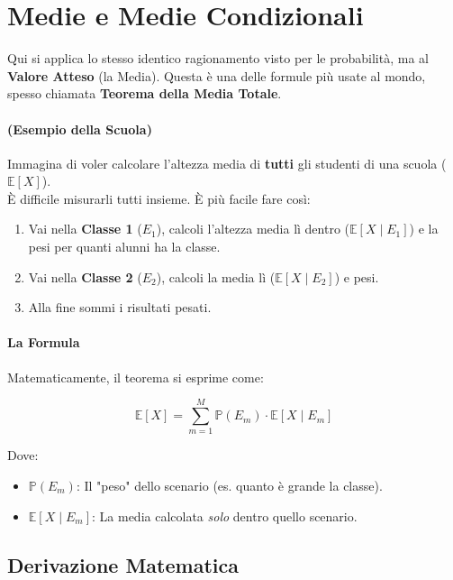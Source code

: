 \section{Medie e Medie Condizionali}

Qui si applica lo stesso identico ragionamento visto per le probabilità, ma al \textbf{Valore Atteso} (la Media). Questa è una delle formule più usate al mondo, spesso chiamata \textbf{Teorema della Media Totale}.

\paragraph{(Esempio della Scuola)}
Immagina di voler calcolare l'altezza media di \textbf{tutti} gli studenti di una scuola ($\mathbb{E}[X]$).
\\È difficile misurarli tutti insieme. È più facile fare così:

\begin{enumerate}
    \item Vai nella \textbf{Classe 1} ($E_1$), calcoli l'altezza media lì dentro ($\mathbb{E}[X \mid E_1]$) e la pesi per quanti alunni ha la classe.
    \item Vai nella \textbf{Classe 2} ($E_2$), calcoli la media lì ($\mathbb{E}[X \mid E_2]$) e pesi.
    \item Alla fine sommi i risultati pesati.
\end{enumerate}

\paragraph{La Formula}
Matematicamente, il teorema si esprime come:

\begin{equation}
\boxed{\mathbb{E}[X] = \sum_{m=1}^M \mathbb{P}(E_m) \cdot \mathbb{E}[X \mid E_m]}
\end{equation}

Dove:
\begin{itemize}
    \item $\mathbb{P}(E_m)$: Il "peso" dello scenario (es. quanto è grande la classe).
    \item $\mathbb{E}[X \mid E_m]$: La media calcolata \textit{solo} dentro quello scenario.
\end{itemize}

\subsection{Derivazione Matematica}

